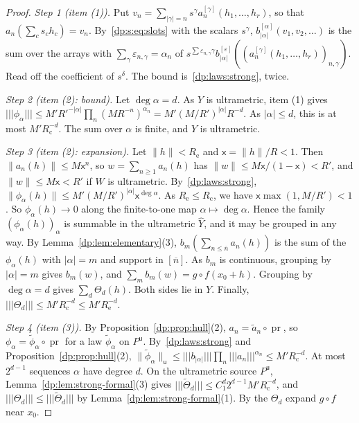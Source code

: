 \documentclass[11pt]{amsart}
\theoremstyle{definition}
\theoremstyle{remark}
\numberwithin{equation}{section}
\newcommand{\abs}[1]{\lvert #1\rvert}
\newcommand{\norm}[1]{\lVert #1\rVert}
\theoremstyle{plain}
\theoremstyle{definition}
\theoremstyle{plain}
\begin{document}
\begin{proof}
\emph{Step 1 (item (1)).} Put $v_n=\sum_{\abs\gamma=n}s^\gamma a_n^{[\gamma]}(h_1,\dots,h_r)$, so that $a_n(\sum_cs_ch_c)=v_n$. By~\eqref{dp:s:eq:slots} with the scalars $s^\gamma$, $b_{\abs\alpha}^{[\alpha]}(v_1,v_2,\dots)$ is the sum over the arrays with $\sum_\gamma\varepsilon_{n,\gamma}=\alpha_n$ of $s^{\sum\varepsilon_{n,\gamma}\gamma}b_{\abs\alpha}^{[\varepsilon]}((a_n^{[\gamma]}(h_1,\dots,h_r))_{n,\gamma})$. Read off the coefficient of $s^\delta$. The bound is~\eqref{dp:laws:strong}, twice.

\emph{Step 2 (item (2): bound).} Let $\deg\alpha=d$. As $Y$ is ultrametric, item (1) gives $\lvert\!\lvert\!\lvert \phi_\alpha\rvert\!\rvert\!\rvert\le M'R'^{-\abs\alpha}\prod_n(MR^{-n})^{\alpha_n}=M'(M/R')^{\abs\alpha}R^{-d}$. As $\abs\alpha\le d$, this is at most $M'R_{\mathrm c}^{-d}$. The sum over $\alpha$ is finite, and $Y$ is ultrametric.

\emph{Step 3 (item (2): expansion).} Let $\norm h<R_{\mathrm e}$ and $\mathsf x=\norm h/R<1$. Then $\norm{a_n(h)}\le M\mathsf x^n$, so $w=\sum_{n\ge1}a_n(h)$ has $\norm w\le M\mathsf x/(1-\mathsf x)<R'$, and $\norm w\le M\mathsf x<R'$ if $W$ is ultrametric. By~\eqref{dp:laws:strong}, $\norm{\phi_\alpha(h)}\le M'(M/R')^{\abs\alpha}\mathsf x^{\deg\alpha}$. As $R_{\mathrm e}\le R_{\mathrm c}$, we have $\mathsf x\max(1,M/R')<1$. So $\phi_\alpha(h)\to0$ along the finite-to-one map $\alpha\mapsto\deg\alpha$. Hence the family $(\phi_\alpha(h))_\alpha$ is summable in the ultrametric $\widehat Y$, and it may be grouped in any way. By Lemma~\ref{dp:lem:elementary}(3), $b_m(\sum_{n\le\overline n}a_n(h))$ is the sum of the $\phi_\alpha(h)$ with $\abs\alpha=m$ and support in $[\overline n]$. As $b_m$ is continuous, grouping by $\abs\alpha=m$ gives $b_m(w)$, and $\sum_mb_m(w)=g\circ f(x_0+h)$. Grouping by $\deg\alpha=d$ gives $\sum_d\Theta_d(h)$. Both sides lie in $Y$. Finally, $\lvert\!\lvert\!\lvert \Theta_d\rvert\!\rvert\!\rvert\le M'R_{\mathrm c}^{-d}\le M'R_{\mathrm e}^{-d}$.

\emph{Step 4 (item (3)).} By Proposition~\ref{dp:prop:hull}(2), $a_n=\tilde a_n\circ\operatorname{pr}$, so $\phi_\alpha=\tilde\phi_\alpha\circ\operatorname{pr}$ for a law $\tilde\phi_\alpha$ on $P^{\mathsf u}$. By~\eqref{dp:laws:strong} and Proposition~\ref{dp:prop:hull}(2), $\norm{\tilde\phi_\alpha}_{\mathsf u}\le\lvert\!\lvert\!\lvert b_{\abs\alpha}\rvert\!\rvert\!\rvert\prod_n\lvert\!\lvert\!\lvert a_n\rvert\!\rvert\!\rvert^{\alpha_n}\le M'R_{\mathrm c}^{-d}$. At most $2^{d-1}$ sequences $\alpha$ have degree $d$. On the ultrametric source $P^{\mathsf u}$, Lemma~\ref{dp:lem:strong-formal}(3) gives $\lvert\!\lvert\!\lvert \tilde\Theta_d\rvert\!\rvert\!\rvert\le C_1^d2^{d-1}M'R_{\mathrm c}^{-d}$, and $\lvert\!\lvert\!\lvert \Theta_d\rvert\!\rvert\!\rvert\le\lvert\!\lvert\!\lvert \tilde\Theta_d\rvert\!\rvert\!\rvert$ by Lemma~\ref{dp:lem:strong-formal}(1). By \cite[Lemma~Q.3]{I} the $\Theta_d$ expand $g\circ f$ near $x_0$.


\end{proof}
\end{document}
